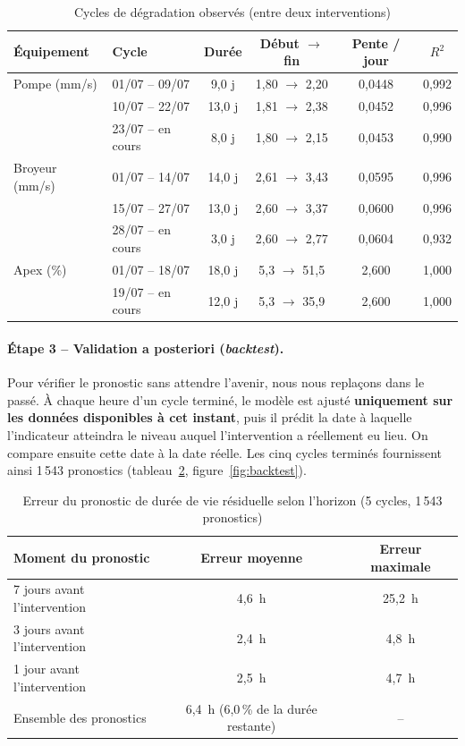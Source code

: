 \begin{table}[H]
\centering
\caption{Cycles de dégradation observés (entre deux interventions)}
\label{tab:cycles}
\small\setlength{\tabcolsep}{4pt}
\begin{tabular}{llcccc}
\toprule
\textbf{Équipement} & \textbf{Cycle} & \textbf{Durée} & \textbf{Début $\rightarrow$ fin} & \textbf{Pente / jour} & \textbf{$R^2$} \\
\midrule
Pompe (mm/s) & 01/07 -- 09/07 & 9,0 j & 1,80 $\rightarrow$ 2,20 & 0,0448 & 0,992 \\
 & 10/07 -- 22/07 & 13,0 j & 1,81 $\rightarrow$ 2,38 & 0,0452 & 0,996 \\
 & 23/07 -- en cours & 8,0 j & 1,80 $\rightarrow$ 2,15 & 0,0453 & 0,990 \\
\midrule
Broyeur (mm/s) & 01/07 -- 14/07 & 14,0 j & 2,61 $\rightarrow$ 3,43 & 0,0595 & 0,996 \\
 & 15/07 -- 27/07 & 13,0 j & 2,60 $\rightarrow$ 3,37 & 0,0600 & 0,996 \\
 & 28/07 -- en cours & 3,0 j & 2,60 $\rightarrow$ 2,77 & 0,0604 & 0,932 \\
\midrule
Apex (\%) & 01/07 -- 18/07 & 18,0 j & 5,3 $\rightarrow$ 51,5 & 2,600 & 1,000 \\
 & 19/07 -- en cours & 12,0 j & 5,3 $\rightarrow$ 35,9 & 2,600 & 1,000 \\
\bottomrule
\end{tabular}
\end{table}

\paragraph{Étape 3 -- Validation a posteriori (\textit{backtest}).} Pour vérifier le pronostic sans attendre l'avenir, nous nous replaçons dans le passé. À chaque heure d'un cycle terminé, le modèle est ajusté \textbf{uniquement sur les données disponibles à cet instant}, puis il prédit la date à laquelle l'indicateur atteindra le niveau auquel l'intervention a réellement eu lieu. On compare ensuite cette date à la date réelle. Les cinq cycles terminés fournissent ainsi 1\,543 pronostics (tableau~\ref{tab:backtest}, figure~\ref{fig:backtest}).

\begin{table}[H]
\centering
\caption{Erreur du pronostic de durée de vie résiduelle selon l'horizon (5 cycles, 1\,543 pronostics)}
\label{tab:backtest}
\small
\begin{tabular}{lcc}
\toprule
\textbf{Moment du pronostic} & \textbf{Erreur moyenne} & \textbf{Erreur maximale} \\
\midrule
7 jours avant l'intervention & 4,6~h & 25,2~h \\
3 jours avant l'intervention & 2,4~h & 4,8~h \\
1 jour avant l'intervention & 2,5~h & 4,7~h \\
\midrule
Ensemble des pronostics & 6,4~h (6,0\,\% de la durée restante) & -- \\
\bottomrule
\end{tabular}
\end{table}

